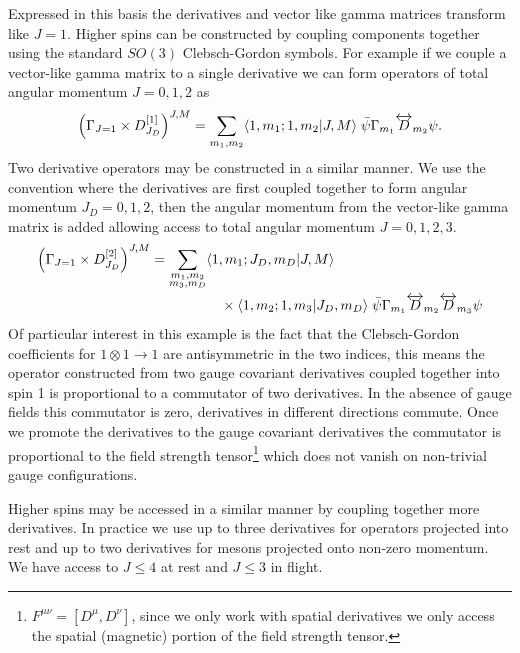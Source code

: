 Expressed in this basis the derivatives and vector like gamma matrices transform like $J=1$. Higher spins can be constructed by coupling components together using the standard $SO(3)$ Clebsch-Gordon symbols. For example if we couple a vector-like gamma matrix to a single derivative we can form operators of total angular momentum $J=0,1,2$ as  
\begin{equation*}
\left( \Gamma_{J=1} \times D^{[1]}_{J_D}\right)^{J,M} = \sum_{m_1,m_2} \langle 1,m_1 ; 1, m_2 | J,M\rangle \; \bar{\psi} \Gamma_{m_1} \overleftrightarrow{D}_{m_2} \psi . 
\end{equation*}
Two derivative operators may be constructed in a similar manner. We use the convention where the derivatives are first coupled together to form angular momentum $J_D = 0,1,2$, then the angular momentum from the vector-like gamma matrix is added allowing access to total angular momentum $J=0,1,2,3$. 
\begin{align*}
\left( \Gamma_{J=1} \times D^{[2]}_{J_D}\right)^{J,M}  = \sum_{\substack{m_1,m_2 \\ m_3,m_D}} & \langle 1,m_1 ; J_D, m_D | J,M\rangle \\ 
& \quad \times \langle 1,m_2 ; 1, m_3 | J_D,m_D\rangle \; \bar{\psi} \Gamma_{m_1} \overleftrightarrow{D}_{m_2} \overleftrightarrow{D}_{m_3} \psi
\end{align*}
Of particular interest in this example is the fact that the Clebsch-Gordon coefficients for $1\otimes1\rightarrow 1$ are antisymmetric in the two indices, this means the operator constructed from two gauge covariant derivatives coupled together into spin 1 is proportional to a commutator of two derivatives. In the absence of gauge fields this commutator is zero, derivatives in different directions commute. Once we promote the derivatives to the gauge covariant derivatives the commutator is proportional to the field strength tensor\footnote{$F^{\mu\nu} = \left[ D^\mu, D^\nu\right]$, since we only work with spatial derivatives we only access the spatial (magnetic) portion of the field strength tensor. } which does not vanish on non-trivial gauge configurations. 

Higher spins may be accessed in a similar manner by coupling together more derivatives. In practice we use up to three derivatives for operators projected into rest and up to two derivatives for mesons projected onto non-zero momentum. We have access to $J\leq 4$ at rest and $J\leq3$ in flight. 



